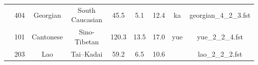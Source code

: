 \begin{table}[h!]
\begin{center}
\begin{tabular}{@{}ccccccccc@{}}
                                  & 404                            & Georgian                       & South Caucasian                  & 45.5       & 5.1        & 12.4     & ka         & georgian\_4\_2\_3.fst      \\
                                  & 101                            & Cantonese                      & Sino-Tibetan                     & 120.3      & 13.5       & 17.0     & yue        & yue\_2\_2\_4.fst           \\
                                  & 203                            & Lao                            & Tai–Kadai                        & 59.2       & 6.5        & 10.6     &            & lao\_2\_2\_2.fst          \\
\bottomrule
\end{tabular}
\end{center}
\end{table}